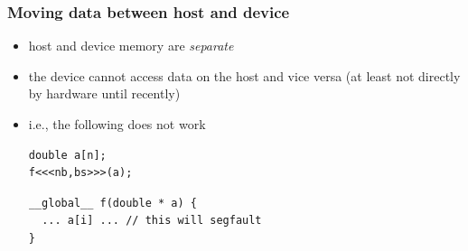 \documentclass[12pt,dvipdfmx]{beamer}
\newcommand{\aka}[1]{{\color{red}#1}}
\begin{document}
\begin{frame}[fragile]
\frametitle{Moving data between host and device}
\begin{itemize}
\item host and device memory are \aka{\it separate}
\item the device cannot access data on the host and vice versa
  (at least not directly by hardware until recently)
\item i.e., the following does not work
\begin{lstlisting}
double a[n];
f<<<nb,bs>>>(a);
\end{lstlisting}

\begin{lstlisting}
__global__ f(double * a) {
  ... a[i] ... // this will segfault
}
\end{lstlisting}
\end{itemize}

\begin{center}
%
\end{center}
\end{frame}
\end{document}
